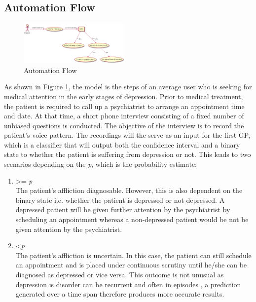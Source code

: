 \documentclass{article}
\begin{document}
	\subsection{Automation Flow} \label{af}
	\begin{figure}[h]
 		\begin{center}
		\includegraphics[width=0.48\textwidth]{automation} 
  		\end{center}
  		\caption{Automation Flow}
  		\label{auto_flow} 
 	\end{figure}

	As shown in Figure \ref{auto_flow}, the model is the steps of an average user who is seeking for medical attention in the early stages of depression.
	Prior to medical treatment, the patient is required to call up a psychiatrist to arrange an appointment time and date. 
	At that time, a short phone interview consisting of a fixed number of unbiased questions is conducted.
	The objective of the interview is to record the patient's voice pattern.
	The recordings will the serve as an input for the first GP, which is a classifier that will output both the confidence interval and a binary state to whether the patient is suffering from depression or not.
	This leads to two scenarios depending on the \emph{p}, which is the probability estimate:
	
	\begin{enumerate}
		\item {\textgreater= \emph{p}} \\
		The patient's affliction diagnosable.
		However, this is also dependent on the binary state i.e. whether the patient is depressed or not depressed. 
		A depressed patient will be given further attention by the psychiatrist by scheduling an appointment whereas a non-depressed patient would be not be given attention by the psychiatrist.
		\item {\textless \emph{p}} \\
		The patient's affliction is uncertain. 
		In this case, the patient can still schedule an appointment and is placed under continuous scrutiny until he/she can be diagnosed as depressed or vice versa.
		This outcome is not unusual as depression is disorder can be recurrent and often in episodes \cite{bp6152013}, a prediction generated over a time span therefore produces more accurate results.\\
	\end{enumerate}
	
\end{document}
